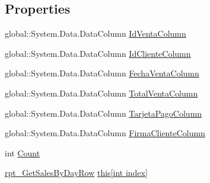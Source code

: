 \subsection*{Properties}
\begin{DoxyCompactItemize}
\item 
global\+::\+System.\+Data.\+Data\+Column \hyperlink{classprj_progra_i_i_i_1_1_prj_progra_i_i_i_data_set_1_1rpt___get_sales_by_day_data_table_a24d9fcdd1d59a010b801a2917d048e6c}{Id\+Venta\+Column}
\item 
global\+::\+System.\+Data.\+Data\+Column \hyperlink{classprj_progra_i_i_i_1_1_prj_progra_i_i_i_data_set_1_1rpt___get_sales_by_day_data_table_ad1085d453e06ababb3449c9ff955dad2}{Id\+Cliente\+Column}
\item 
global\+::\+System.\+Data.\+Data\+Column \hyperlink{classprj_progra_i_i_i_1_1_prj_progra_i_i_i_data_set_1_1rpt___get_sales_by_day_data_table_ae3f50cc435078d6a6b6ac0346bf2669c}{Fecha\+Venta\+Column}
\item 
global\+::\+System.\+Data.\+Data\+Column \hyperlink{classprj_progra_i_i_i_1_1_prj_progra_i_i_i_data_set_1_1rpt___get_sales_by_day_data_table_a09566d089e40e5e1ca261ac57779c84f}{Total\+Venta\+Column}
\item 
global\+::\+System.\+Data.\+Data\+Column \hyperlink{classprj_progra_i_i_i_1_1_prj_progra_i_i_i_data_set_1_1rpt___get_sales_by_day_data_table_a83a625ee08ea0ed6a30f097475b206a5}{Tarjeta\+Pago\+Column}
\item 
global\+::\+System.\+Data.\+Data\+Column \hyperlink{classprj_progra_i_i_i_1_1_prj_progra_i_i_i_data_set_1_1rpt___get_sales_by_day_data_table_a7baa11b96f660922c1137750a19e23e5}{Firma\+Cliente\+Column}
\item 
int \hyperlink{classprj_progra_i_i_i_1_1_prj_progra_i_i_i_data_set_1_1rpt___get_sales_by_day_data_table_aead744551a5cfd698efb4ee9d4fec4c6}{Count}
\item 
\hyperlink{classprj_progra_i_i_i_1_1_prj_progra_i_i_i_data_set_1_1rpt___get_sales_by_day_row}{rpt\+\_\+\+Get\+Sales\+By\+Day\+Row} \hyperlink{classprj_progra_i_i_i_1_1_prj_progra_i_i_i_data_set_1_1rpt___get_sales_by_day_data_table_a700d1b52e3becd79e3a2e266a01eaa3a}{this\mbox{[}int index\mbox{]}}
\end{DoxyCompactItemize}
